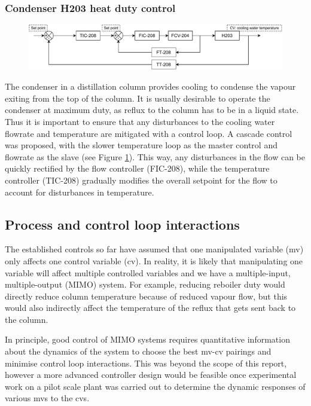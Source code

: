\subsubsection{Condenser H203 heat duty control}%
\begin{figure}
    \centering
    \includegraphics[width=\linewidth]{chapters/4-operation-control/4-Figures/H203-TC.pdf}
    \caption{}
    \label{fig:S203C-TC}
\end{figure}
The condenser in a distillation column provides cooling to condense the vapour exiting from the top of the column. It is usually desirable to operate the condenser at maximum duty, as reflux to the column has to be in a liquid state. Thus it is important to ensure that any disturbances to the cooling water flowrate and temperature are mitigated with a control loop. A cascade control was proposed, with the slower temperature loop as the master control and flowrate as the slave (see Figure \ref{fig:S203C-TC}). This way, any disturbances in the flow can be quickly rectified by the flow controller (FIC-208), while the temperature controller (TIC-208) gradually modifies the overall setpoint for the flow to account for disturbances in temperature.

\subsection{Process and control loop interactions}
The established controls so far have assumed that one manipulated variable (mv) only affects one control variable (cv). In reality, it is likely that manipulating one variable will affect multiple controlled variables and we have a multiple-input, multiple-output (MIMO) system. For example, reducing reboiler duty would directly reduce column temperature because of reduced vapour flow, but this would also indirectly affect the temperature of the reflux that gets sent back to the column. 

In principle, good control of MIMO systems requires quantitative information about the dynamics of the system to choose the best mv-cv pairings and minimise control loop interactions. This was beyond the scope of this report, however a more advanced controller design would be feasible once experimental work on a pilot scale plant was carried out to determine the dynamic responses of various mvs to the cvs.

